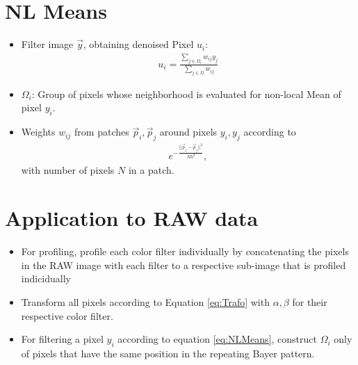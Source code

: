 \documentclass[]{article}
\begin{document}
\section{NL Means}
\begin{itemize}
	\item Filter image $\vec{y}$, obtaining denoised Pixel $u_i$:
	\begin{align}
		u_i = \frac{\sum_{j\in \Omega_i} w_{ij} y_j}{\sum_{j\in \Omega} w_{ij}}
		\label{eq:NLMeans}
	\end{align}
	\item $\Omega_i$: Group of pixels whose neighborhood is evaluated for non-local Mean of pixel $y_i$.
	\item Weights $w_{ij}$ from patches $\vec{p}_i, \vec{p}_j$ around pixels $y_i, y_j$ according to
	\begin{align}
		e^{- \frac{||\vec{p}_i - \vec{p}_j||^2}{N h^2}},
	\end{align}
	with number of pixels $N$ in a patch.
\end{itemize}
\section{Application to RAW data}
\begin{itemize}
	\item For profiling, profile each color filter individually by concatenating the pixels in the RAW image with each filter to a respective sub-image that is profiled indicidually
	\item Transform all pixels according to Equation \ref{eq:Trafo} with $\alpha, \beta$ for their respective color filter.
	\item For filtering a pixel $y_i$ according to equation \ref{eq:NLMeans}, construct $\Omega_i$ only of pixels that have the same position in the repeating Bayer pattern.
\end{itemize}
\end{document}
